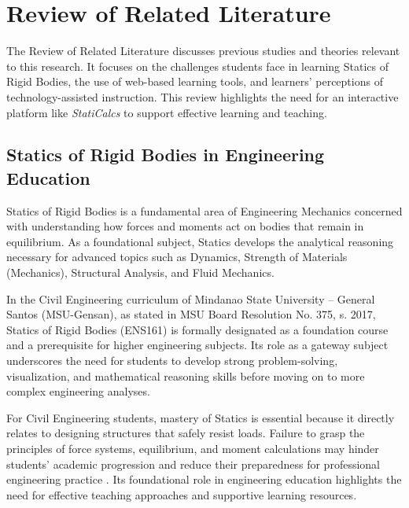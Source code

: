 \chapter{Review of Related Literature}

The Review of Related Literature discusses previous studies and theories relevant to this research. It focuses on the challenges students face in learning Statics of Rigid Bodies, the use of web-based learning tools, and learners' perceptions of technology-assisted instruction. This review highlights the need for an interactive platform like \textit{StatiCalcs} to support effective learning and teaching.


\section{Statics of Rigid Bodies in Engineering Education}

Statics of Rigid Bodies is a fundamental area of Engineering Mechanics concerned with understanding how forces and moments act on bodies that remain in equilibrium. As a foundational subject, Statics develops the analytical reasoning necessary for advanced topics such as Dynamics, Strength of Materials (Mechanics), Structural Analysis, and Fluid Mechanics. 

In the Civil Engineering curriculum of Mindanao State University -- General Santos (MSU-Gensan), as stated in MSU Board Resolution No. 375, s. 2017, Statics of Rigid Bodies (ENS161) is formally designated as a foundation course and a prerequisite for higher engineering subjects. Its role as a gateway subject underscores the need for students to develop strong problem-solving, visualization, and mathematical reasoning skills before moving on to more complex engineering analyses. 

For Civil Engineering students, mastery of Statics is essential because it directly relates to designing structures that safely resist loads. Failure to grasp the principles of force systems, equilibrium, and moment calculations may hinder students’ academic progression and reduce their preparedness for professional engineering practice \autocite{salami_exploring_2024}. Its foundational role in engineering education highlights the need for effective teaching approaches and supportive learning resources.


